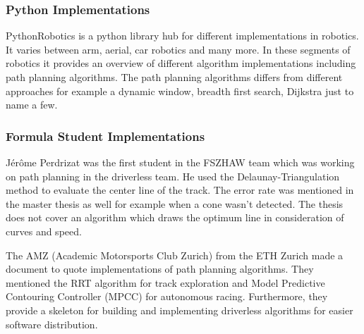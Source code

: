 \subsubsection{Python Implementations}
PythonRobotics is a python library hub for different implementations in robotics. It varies between arm, aerial, car robotics and many more.
In these segments of robotics it provides an overview of different algorithm implementations including path planning algorithms.
The path planning algorithms differs from different approaches for example a dynamic window, breadth first search, Dijkstra just to name a few. 
\cite{python_robotics}

\subsubsection{Formula Student Implementations}
Jérôme Perdrizat was the first student in the FSZHAW team which was working on path planning in the driverless team. He used the Delaunay-Triangulation method to evaluate the center line of the track. The error rate was mentioned in the master thesis as well for example when a cone wasn't detected. The thesis does not cover an algorithm which draws the optimum line in consideration of curves and speed.
\cite{autopilot_for_formula_student_jerome}

The AMZ (Academic Motorsports Club Zurich) from the ETH Zurich made a document to quote implementations of path planning algorithms. They mentioned the RRT algorithm for track exploration and Model Predictive Contouring Controller (MPCC) for autonomous racing. Furthermore, they provide a skeleton for building and implementing driverless algorithms for easier software distribution.
\cite{amz_racing_github}

